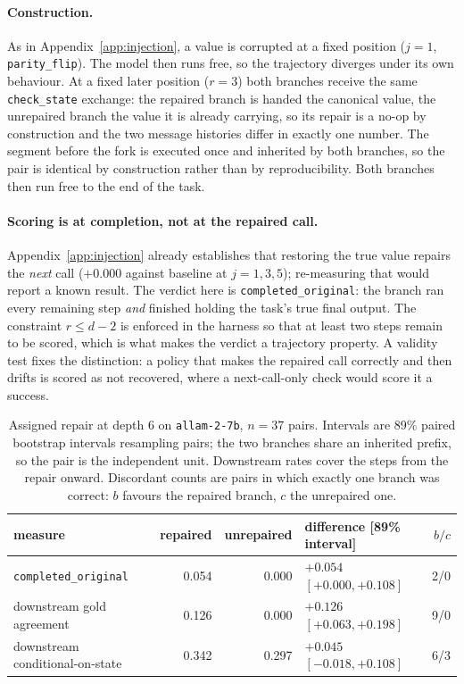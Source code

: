 \documentclass{article}
\begin{document}
\paragraph{Construction.} As in Appendix~\ref{app:injection}, a value is corrupted at a
fixed position ($j=1$, \texttt{parity\_flip}). The model then runs free, so the trajectory
diverges under its own behaviour. At a fixed later position ($r=3$) both branches receive
the same \texttt{check\_state} exchange: the repaired branch is handed the canonical value,
the unrepaired branch the value it is already carrying, so its repair is a no-op by
construction and the two message histories differ in exactly one number. The segment before
the fork is executed once and inherited by both branches, so the pair is identical by
construction rather than by reproducibility. Both branches then run free to the end of the
task.

\paragraph{Scoring is at completion, not at the repaired call.} Appendix~\ref{app:injection}
already establishes that restoring the true value repairs the \emph{next} call ($+0.000$
against baseline at $j=1,3,5$); re-measuring that would report a known result. The verdict
here is \texttt{completed\_original}: the branch ran every remaining step \emph{and}
finished holding the task's true final output. The constraint $r \le d-2$ is enforced in the
harness so that at least two steps remain to be scored, which is what makes the verdict a
trajectory property. A validity test fixes the distinction: a policy that makes the
repaired call correctly and then drifts is scored as not recovered, where a
next-call-only check would score it a success.

\begin{table}[h]
\centering
\caption{Assigned repair at depth 6 on \texttt{allam-2-7b}, $n=37$ pairs. Intervals are
89\% paired bootstrap intervals resampling pairs; the two branches share an inherited
prefix, so the pair is the independent unit. Downstream rates cover the steps from the
repair onward. Discordant counts are pairs in which exactly one branch was correct: $b$
favours the repaired branch, $c$ the unrepaired one.}
\label{tab:repair}
\footnotesize
\begin{tabular}{@{}lrrlr@{}}
\toprule
measure & repaired & unrepaired & difference [89\% interval] & $b/c$ \\
\midrule
\texttt{completed\_original} & 0.054 & 0.000 & $+0.054$ $[+0.000,+0.108]$ & 2/0 \\
downstream gold agreement & 0.126 & 0.000 & \textbf{$+0.126$} $[+0.063,+0.198]$ & 9/0 \\
downstream conditional-on-state & 0.342 & 0.297 & $+0.045$ $[-0.018,+0.108]$ & 6/3 \\
\bottomrule
\end{tabular}
\end{table}
\end{document}
